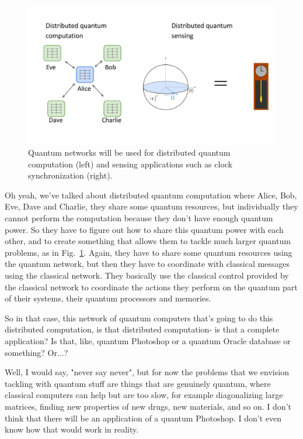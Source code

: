 \begin{figure}[t]
    \centering
    \includegraphics[width=1\textwidth]{lesson15/R2L15fig5.pdf}
    \caption[Uses of quantum networking]{Quantum networks will be used for distributed quantum computation (left) and sensing applications such as clock synchronization (right).}
    \label{fig:15-5-apps}
\end{figure}


\mmm Oh yeah, we've talked about distributed quantum computation where Alice, Bob, Eve, Dave and Charlie, they share some quantum resources, but individually they cannot perform the computation because they don't have enough quantum power. So they have to figure out how to share this quantum power with each other, and to create something that allows them to tackle much larger quantum problems, as in Fig.~\ref{fig:15-5-apps}. Again, they have to share some quantum resources using the quantum network, but then they have to coordinate with classical messages using the classical network. They basically use the classical control provided by the classical network to coordinate the actions they perform on the quantum part of their systems, their quantum processors and memories.

\rrr So in that case, this network of quantum computers that's going to do this distributed computation, is that distributed computation- is that a complete application? Is that, like, quantum Photoshop or a quantum Oracle database or something? Or...?

\mmm Well, I would say, "never say never", but for now the problems that we envision tackling with quantum stuff are things that are genuinely quantum, where classical computers can help but are too slow, for example diagonalizing large matrices, finding new properties of new drugs, new materials, and so on. I don't think that there will be an application of a quantum Photoshop. I don't even know how that would work in reality.

